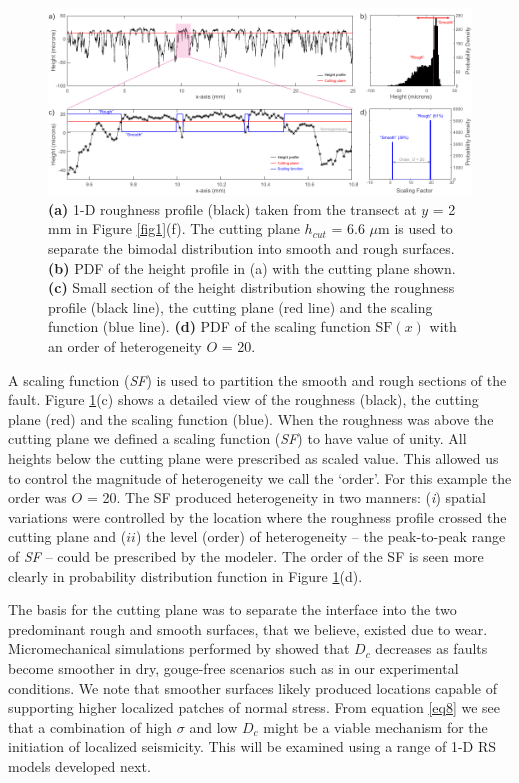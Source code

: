 \documentclass[final,3p, 11pt,authoryear]{elsarticle}
\begin{document}
\begin{figure}[ht]
	\centering
	\includegraphics{FIG3.pdf} 
	\caption{ \textbf{(a)} 1-D roughness profile (black) taken from the transect at $y$ = 2 mm in Figure \ref{fig1}(f).  The cutting plane $h_{cut}$ = 6.6 $\mu$m is used to separate the bimodal distribution into smooth and rough surfaces. \textbf{(b)} PDF of the height profile in (a) with the cutting plane shown. \textbf{(c)} Small section of the height distribution showing the roughness profile (black line), the cutting plane (red line) and the scaling function (blue line). \textbf{(d)} PDF of the scaling function $\mathrm{SF}(x)$ with an order of heterogeneity $O$ = 20.}
	\label{fig3}
\end{figure}

A scaling function (\textit{SF}) is used to partition the smooth and rough sections of the fault. Figure \ref{fig3}(c) shows a detailed view of the roughness (black), the cutting plane (red) and the scaling function (blue). When the roughness was above the cutting plane we defined a scaling function (\textit{SF}) to have value of unity. All heights below the cutting plane were prescribed as scaled value. This allowed us to control the magnitude of heterogeneity we call the `order'. For this example the order was $O$ = 20. The SF produced heterogeneity in two manners: (\textit{i}) spatial variations were controlled by the location where the roughness profile crossed the cutting plane and ($ii$) the level (order) of heterogeneity -- the peak-to-peak range of \textit{SF} -- could be prescribed by the modeler. The order of the SF is seen more clearly in probability distribution function in Figure \ref{fig3}(d).

	The basis for the cutting plane was to separate the interface into the two predominant rough and smooth surfaces, that we believe, existed due to wear.  Micromechanical simulations performed by \citet{Yoshioka1996} showed that $D_{c}$ decreases as faults become smoother in dry, gouge-free scenarios such as in our experimental conditions. We  note that smoother surfaces likely produced locations capable of supporting higher localized patches of normal stress. From equation \eqref{eq8} we see that a combination of high $\sigma$ and low $D_{c}$ might be a viable mechanism for the initiation of localized seismicity. This will be examined using a range of 1-D RS models developed next.
\end{document}
